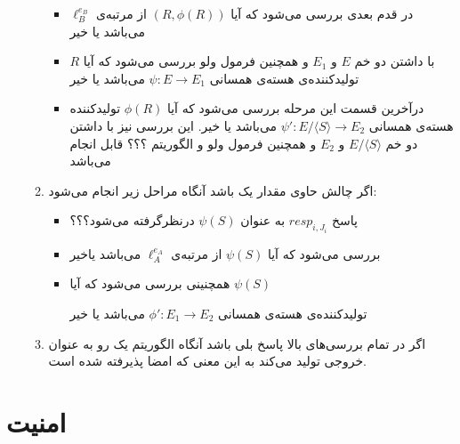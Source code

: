 \begin{itemize}
\begin{enumerate}
{\begin{itemize}
		\item {
		در قدم بعدی بررسی می‌شود که آیا
		$(R,\phi(R))$
		از مرتبه‌ی
		$\ell_B^{e_B}$
		می‌باشد یا خیر
		}
		\item {
		با داشتن دو خم 
		$E$
		و
		$E_1$
		و همچنین فرمول ولو بررسی می‌شود که آیا 
		$R$
		تولیدکننده‌ی هسته‌ی همسانی
		$\psi : E \rightarrow E_1$
		می‌باشد یا خیر
		}
	
		\item {
			درآخرین قسمت این مرحله بررسی می‌شود که آیا
		$\phi(R)$
		تولیدکننده هسته‌ی همسانی
		${\psi}' : E / \langle S \rangle \rightarrow E_2$
		می‌باشد یا خیر. این بررسی نیز با داشتن دو خم 
		$E / \langle S \rangle$
		و
		$E_2$
		و همچنین فرمول ولو و  الگوریتم ؟؟؟ قابل انجام می‌باشد
		
		}
	\end{itemize}		
	}

	\item {
	اگر چالش حاوی مقدار یک باشد آنگاه مراحل زیر انجام می‌شود:
	\begin{itemize}
		\item {
		پاسخ 
		$resp_{i,J_i}$
		به عنوان 
		$\psi(S)$
		درنظرگرفته می‌شود؟؟؟
		}
	
		\item {
		بررسی می‌شود که آیا
		$\psi(S)$
		از مرتبه‌ی
		$\ell_A^{e_A}$
		می‌باشد یاخیر
		}
	
		\item {
		همچنینی بررسی می‌شود که آیا 
		$\psi(S)$
		
		تولیدکننده‌ی هسته‌ی همسانی
		${\phi}' :‌E_1 \rightarrow E_2$
		می‌باشد یا خیر
		}
	\end{itemize}
	}

	\item {
	اگر در تمام بررسی‌های بالا پاسخ بلی باشد آنگاه الگوریتم یک رو به عنوان خروجی تولید می‌کند به این معنی که امضا پذیرفته شده است.
	}
\end{enumerate}
\end{itemize}






\section{\bf امنیت}\label{security}

